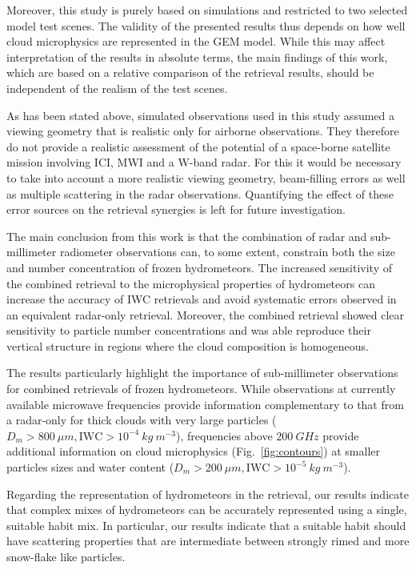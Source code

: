 \documentclass[journal abbreviation, manuscript]{copernicus}
\begin{document}
Moreover, this study is purely based on simulations and restricted to two
selected model test scenes. The validity of the presented results thus depends
on how well cloud microphysics are represented in the GEM model. While this may
affect interpretation of the results in absolute terms, the main findings of
this work, which are based on a relative comparison of the retrieval results,
should be independent of the realism of the test scenes.

As has been stated above, simulated observations used in this study assumed a
viewing geometry that is realistic only for airborne observations. They
therefore do not provide a realistic assessment of the potential of a
space-borne satellite mission involving ICI, MWI and a W-band radar. For this it
would be necessary to take into account a more realistic viewing geometry,
beam-filling errors as well as multiple scattering in the radar observations.
Quantifying the effect of these error sources on the retrieval synergies is
left for future investigation.

\conclusions  %
\label{sec:conclusions}

The main conclusion from this work is that the combination of radar and
sub-millimeter radiometer observations can, to some extent, constrain both the
size and number concentration of frozen hydrometeors. The increased sensitivity
of the combined retrieval to the microphysical properties of hydrometeors can
increase the accuracy of IWC retrievals and avoid systematic errors observed in
an equivalent radar-only retrieval. Moreover, the combined retrieval showed clear
sensitivity to  particle number concentrations and was able reproduce their vertical
structure in regions where the cloud composition is homogeneous.

The results particularly highlight the importance of sub-millimeter observations
for combined retrievals of frozen hydrometeors. While observations at currently
available microwave frequencies provide information complementary to that from a
radar-only for thick clouds with very large particles ($D_m > 800\ \unit{\mu m},
\text{IWC} > 10^{-4}\ \unit{kg\ m^{-3}}$), frequencies above $200\ \unit{GHz}$
provide additional information on cloud microphysics (Fig.~\ref{fig:contours})
at smaller particles sizes and water content ($D_m > 200\ \unit{\mu m},
\text{IWC} > 10^{-5}\ \unit{kg\ m^{-3}}$).

Regarding the representation of hydrometeors in the retrieval, our results
indicate that complex mixes of hydrometeors can be accurately represented using
a single, suitable habit mix. In particular, our results indicate that a
suitable habit should have scattering properties that are intermediate between
strongly rimed and more snow-flake like particles.
\end{document}
